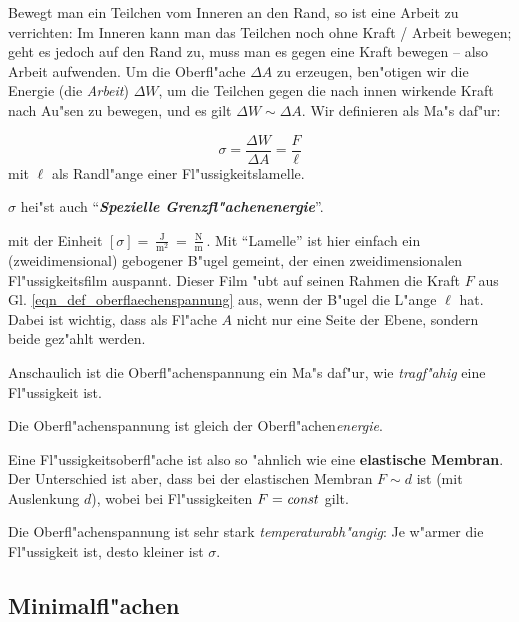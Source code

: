 Bewegt man ein Teilchen vom Inneren an den Rand, so ist eine Arbeit zu
verrichten: Im Inneren kann man das Teilchen noch ohne Kraft / Arbeit
bewegen; geht es jedoch auf den Rand zu, muss man es gegen eine Kraft
bewegen -- also Arbeit aufwenden. Um die Oberfl"ache $\Delta A$ zu
erzeugen, ben"otigen wir die Energie (die \emph{Arbeit}) $\Delta W$,
um die Teilchen gegen die nach innen wirkende Kraft nach Au"sen zu
bewegen, und es gilt $\Delta W \sim \Delta A$. Wir definieren als Ma"s
daf"ur:
\begin{Def}
   \begin{equation}
      \label{eqn_def_oberflaechenspannung}
      \sigma = \frac{\Delta W}{\Delta A} = \frac{F}{\ell}
   \end{equation}
mit $\ell$ als Randl"ange einer Fl"ussigkeitslamelle.

$\sigma$ hei"st auch "`\textbf{\emph{Spezielle
    Grenzfl"achenenergie}}"'.
\end{Def}
mit der Einheit $[\sigma] =
\frac{\operatorname{J}}{\operatorname{m^2}} =
\frac{\operatorname{N}}{\operatorname{m}}$. Mit "`Lamelle"' ist hier
einfach ein (zweidimensional) gebogener B"ugel gemeint, der einen
zweidimensionalen Fl"ussigkeitsfilm auspannt. Dieser Film "ubt auf
seinen Rahmen die Kraft $F$ aus
Gl. \eqref{eqn_def_oberflaechenspannung} aus, wenn der B"ugel die
L"ange $\ell$ hat. Dabei ist wichtig, dass als Fl"ache $A$ nicht nur
eine Seite der Ebene, sondern beide gez"ahlt werden.

Anschaulich ist die Oberfl"achenspannung ein Ma"s daf"ur, wie
\emph{tragf"ahig} eine Fl"ussigkeit ist.

\begin{Wichtig}
   Die Oberfl"achenspannung ist gleich der
   Oberfl"achen\emph{energie}.
\end{Wichtig}
Eine Fl"ussigkeitsoberfl"ache ist also so "ahnlich wie eine \textbf{elastische
Membran}. Der Unterschied ist aber, dass bei der elastischen Membran $F
\sim d$ ist (mit Auslenkung $d$), wobei bei Fl"ussigkeiten $F = \text{\emph{const}}$ gilt.



Die Oberfl"achenspannung ist sehr stark \emph{temperaturabh"angig}: Je
w"armer die Fl"ussigkeit ist, desto kleiner ist $\sigma$.



\subsection{Minimalfl"achen}
\label{kap_minimalflachen}


